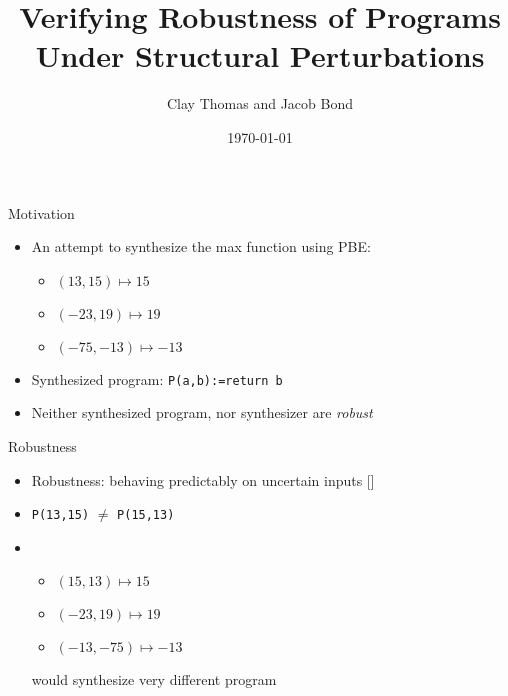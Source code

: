 \documentclass[usenames,dvipsnames]{beamer}
\title{Verifying Robustness of Programs Under Structural Perturbations}
\author{Clay Thomas and Jacob Bond}
\date{\today}
\begin{document}

\begin{frame}
  \titlepage
\end{frame}

\begin{frame}[fragile]{Motivation}
    \begin{itemize}
        \item<1-> An attempt to synthesize the max function using PBE:
            \begin{itemize}
                \item \((13, 15) \mapsto 15\)
                \item \((-23, 19) \mapsto 19\)
                \item \((-75, -13) \mapsto -13\)
            \end{itemize}
        \item<2-> Synthesized program: \verb!P(a,b):=return b!
        \item<3-> Neither synthesized program, nor synthesizer are {\it robust}
    \end{itemize}
\end{frame}

\begin{frame}[fragile]{Robustness}
    \begin{itemize}
        \item<1-> Robustness: behaving predictably on uncertain inputs [\cite{chaudhuri12}]
        \item<2-> \verb!P(13,15)! \(\not=\) \verb!P(15,13)!
        \item<3-> 
            \begin{itemize}
                \item \((15, 13) \mapsto 15\)
                \item \((-23, 19) \mapsto 19\)
                \item \((-13, -75) \mapsto -13\)
            \end{itemize}
            would synthesize very different program
    \end{itemize}
\end{frame}
\end{document}
